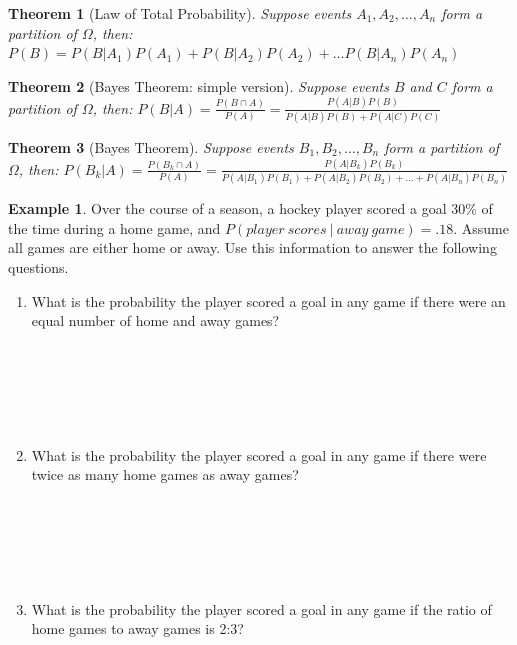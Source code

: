 \documentclass[
  11pt,
]{book}
\newtheorem{theorem}{Theorem}[chapter]
\theoremstyle{definition}
\theoremstyle{definition}
\newtheorem{example}{Example}[chapter]
\theoremstyle{definition}
\theoremstyle{definition}
\theoremstyle{remark}
\begin{document}
\begin{theorem}[Law of Total Probability]
Suppose events \(A_1, A_2, \ldots, A_n\) form a partition of \(\Omega\), then:
\(P(B) = P(B|A_1)P(A_1) + P(B|A_2)P(A_2) + \ldots P(B|A_n)P(A_n)\)
\end{theorem}

\begin{theorem}[Bayes Theorem: simple version]
Suppose events \(B\) and \(C\) form a partition of \(\Omega\), then:
\(P(B|A) = \frac{P(B \cap A)}{P(A)} = \frac{P(A|B)P(B)}{P(A|B)P(B)+P(A|C)P(C)}\)
\end{theorem}

\begin{theorem}[Bayes Theorem]
Suppose events \(B_1, B_2, \ldots, B_n\) form a partition of \(\Omega\), then:
\(P(B_k|A) = \frac{P(B_k \cap A)}{P(A)} = \frac{P(A|B_k)P(B_k)}{P(A|B_1)P(B_1)+P(A|B_2)P(B_2) + \ldots + P(A|B_n)P(B_n)}\)
\end{theorem}

\begin{example}
Over the course of a season, a hockey player scored a goal 30\% of the time during a home game, and \(P(player\ scores\ |\ away\ game) = .18\). Assume all games are either home or away. Use this information to answer the following questions.
\end{example}

\begin{enumerate}
\def\labelenumi{(\alph{enumi})}
\item
  What is the probability the player scored a goal in any game if there were an equal number of home and away games?\\
  \strut \\
  \strut \\
  \strut \\
\item
  What is the probability the player scored a goal in any game if there were twice as many home games as away games?\\
  \strut \\
  \strut \\
  \strut \\
\item
  What is the probability the player scored a goal in any game if the ratio of home games to away games is 2:3?\\
  \strut \\
  \strut \\
  \strut \\
\end{enumerate}
\end{document}
